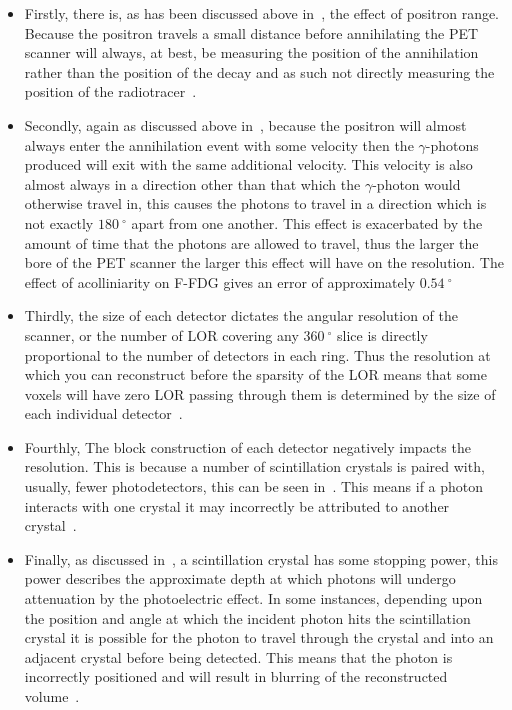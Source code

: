                 \begin{itemize}
                    \item Firstly, there is, as has been discussed above in~, the effect of positron range. Because the positron travels a small distance before annihilating the \gls{PET} scanner will always, at best, be measuring the position of the annihilation rather than the position of the decay and as such not directly measuring the position of the radiotracer~.
                    
                    \item Secondly, again as discussed above in~, because the positron will almost always enter the annihilation event with some velocity then the $\gamma$-photons produced will exit with the same additional velocity. This velocity is also almost always in a direction other than that which the $\gamma$-photon would otherwise travel in, this causes the photons to travel in a direction which is not exactly $\SI{180}{^{\circ}}$ apart from one another. This effect is exacerbated by the amount of time that the photons are allowed to travel, thus the larger the bore of the \gls{PET} scanner the larger this effect will have on the resolution. The effect of acolliniarity on \gls{F-FDG} gives an error of approximately $\SI{0.54}{^{\circ}}$~
                    
                    \item Thirdly, the size of each detector dictates the angular resolution of the scanner, or the number of \gls{LOR} covering any $\SI{360}{^{\circ}}$ slice is directly proportional to the number of detectors in each ring. Thus the resolution at which you can reconstruct before the sparsity of the \gls{LOR} means that some voxels will have zero \gls{LOR} passing through them is determined by the size of each individual detector~.
                    
                    \item Fourthly, The block construction of each detector negatively impacts the resolution. This is because a number of scintillation crystals is paired with, usually, fewer photodetectors, this can be seen in~. This means if a photon interacts with one crystal it may incorrectly be attributed to another crystal~.
                    
                    \item Finally, as discussed in~, a scintillation crystal has some stopping power, this power describes the approximate depth at which photons will undergo attenuation by the photoelectric effect. In some instances, depending upon the position and angle at which the incident photon hits the scintillation crystal it is possible for the photon to travel through the crystal and into an adjacent crystal before being detected. This means that the photon is incorrectly positioned and will result in blurring of the reconstructed volume~.
                \end{itemize}
        
